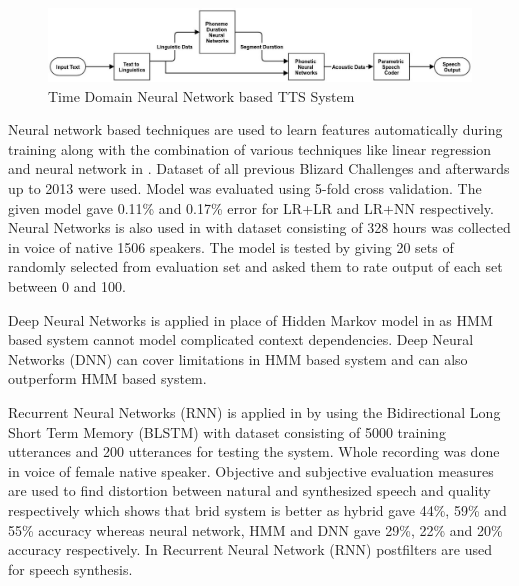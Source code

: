 \begin{center}
	\begin{figure}[hbtp]
		\centering
		\includegraphics[width=\linewidth]{images/time_domain_neural_network.jpg}
		\caption{Time Domain Neural Network based TTS System}
		\label{fig:Time Domain Neural Network based TTS System}
	\end{figure}
		
\end{center}
Neural network based techniques are used to learn features automatically during training along with the combination of various techniques 
like linear regression and neural network in \cite{yoshimura2016hierarchical}. Dataset of all previous Blizard Challenges \cite{blizzard_2009_corpus} and
afterwards up to 2013 were used. Model was evaluated using 5-fold cross validation. The given model gave 0.11\% and 0.17\% error for LR+LR and LR+NN 
respectively. Neural Networks is also used in \cite{wu2016merlin} with dataset consisting of 328 hours was collected in
voice of native 1506 speakers. The model is tested by giving 20 sets of randomly selected from
evaluation set and asked them to rate output of each set between 0 and 100.

Deep Neural Networks is applied in place of Hidden Markov model in \cite{ze2013statistical} as HMM
based system cannot model complicated context dependencies. Deep Neural Networks (DNN) can
cover limitations in HMM based system and can also outperform HMM based system. 

Recurrent Neural Networks (RNN) is applied in \cite{fan2014tts} by using the Bidirectional Long
Short Term Memory (BLSTM) with dataset consisting of 5000 training utterances and 200
utterances for testing the system. Whole recording was done in voice of female native speaker.
Objective and subjective evaluation measures are used to find distortion between natural and
synthesized speech and quality respectively which shows that brid system is better as
hybrid gave 44\%, 59\% and 55\% accuracy whereas neural network, HMM and DNN gave 29\%,
22\% and 20\% accuracy respectively. In \cite{muthukumar2016recurrent} Recurrent Neural Network (RNN) postfilters 
are used for speech synthesis. 


